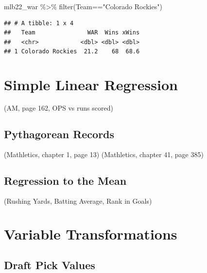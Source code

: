 \documentclass[
  11pt,
]{book}
\newenvironment{Shaded}{\begin{snugshade}}{\end{snugshade}}
\newcommand{\FunctionTok}[1]{\textcolor[rgb]{0.00,0.00,0.00}{#1}}
\newcommand{\NormalTok}[1]{#1}
\newcommand{\SpecialCharTok}[1]{\textcolor[rgb]{0.00,0.00,0.00}{#1}}
\newcommand{\StringTok}[1]{\textcolor[rgb]{0.31,0.60,0.02}{#1}}
\theoremstyle{definition}
\theoremstyle{definition}
\theoremstyle{definition}
\theoremstyle{definition}
\theoremstyle{remark}
\begin{document}
\begin{Shaded}
\begin{Highlighting}[]
\NormalTok{mlb22\_war }\SpecialCharTok{\%\textgreater{}\%} \FunctionTok{filter}\NormalTok{(Team}\SpecialCharTok{==}\StringTok{"Colorado Rockies"}\NormalTok{)}
\end{Highlighting}
\end{Shaded}

\begin{verbatim}
## # A tibble: 1 x 4
##   Team               WAR  Wins xWins
##   <chr>            <dbl> <dbl> <dbl>
## 1 Colorado Rockies  21.2    68  68.6
\end{verbatim}

\newpage

\newpage

\hypertarget{simple-linear-regression}{%
\section{Simple Linear Regression}\label{simple-linear-regression}}

(AM, page 162, OPS vs runs scored)

\hypertarget{pythagorean-records}{%
\subsection{Pythagorean Records}\label{pythagorean-records}}

(Mathletics, chapter 1, page 13)
(Mathletics, chapter 41, page 385)

\hypertarget{regression-to-the-mean}{%
\subsection{Regression to the Mean}\label{regression-to-the-mean}}

(Rushing Yards, Batting Average, Rank in Goals)

\hypertarget{variable-transformations}{%
\section{Variable Transformations}\label{variable-transformations}}

\hypertarget{draft-pick-values}{%
\subsection{Draft Pick Values}\label{draft-pick-values}}
\end{document}
